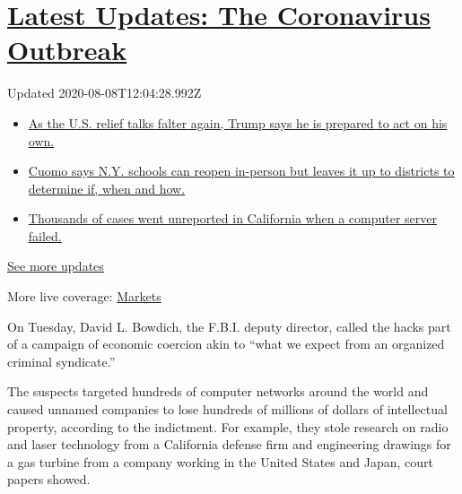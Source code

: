 \hypertarget{latest-updates-the-coronavirus-outbreak}{%
\section{\texorpdfstring{\href{https://www.nytimes.com/2020/08/07/world/covid-19-news.html?action=click\&pgtype=Article\&state=default\&region=MAIN_CONTENT_1\&context=storylines_live_updates}{Latest
Updates: The Coronavirus
Outbreak}}{Latest Updates: The Coronavirus Outbreak}}\label{latest-updates-the-coronavirus-outbreak}}

Updated 2020-08-08T12:04:28.992Z

\begin{itemize}
\tightlist
\item
  \href{https://www.nytimes.com/2020/08/07/world/covid-19-news.html?action=click\&pgtype=Article\&state=default\&region=MAIN_CONTENT_1\&context=storylines_live_updates\#link-1f86d03a}{As
  the U.S. relief talks falter again, Trump says he is prepared to act
  on his own.}
\item
  \href{https://www.nytimes.com/2020/08/07/world/covid-19-news.html?action=click\&pgtype=Article\&state=default\&region=MAIN_CONTENT_1\&context=storylines_live_updates\#link-3f64a70a}{Cuomo
  says N.Y. schools can reopen in-person but leaves it up to districts
  to determine if, when and how.}
\item
  \href{https://www.nytimes.com/2020/08/07/world/covid-19-news.html?action=click\&pgtype=Article\&state=default\&region=MAIN_CONTENT_1\&context=storylines_live_updates\#link-14e70066}{Thousands
  of cases went unreported in California when a computer server failed.}
\end{itemize}

\href{https://www.nytimes.com/2020/08/07/world/covid-19-news.html?action=click\&pgtype=Article\&state=default\&region=MAIN_CONTENT_1\&context=storylines_live_updates}{See
more updates}

More live coverage:
\href{https://www.nytimes.com/live/2020/08/07/business/stock-market-today-coronavirus?action=click\&pgtype=Article\&state=default\&region=MAIN_CONTENT_1\&context=storylines_live_updates}{Markets}

On Tuesday, David L. Bowdich, the F.B.I. deputy director, called the
hacks part of a campaign of economic coercion akin to ``what we expect
from an organized criminal syndicate.''

The suspects targeted hundreds of computer networks around the world and
caused unnamed companies to lose hundreds of millions of dollars of
intellectual property, according to the indictment. For example, they
stole research on radio and laser technology from a California defense
firm and engineering drawings for a gas turbine from a company working
in the United States and Japan, court papers showed.


